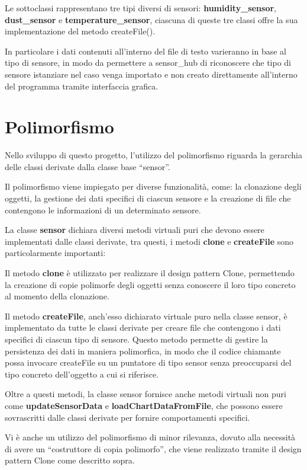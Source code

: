 \documentclass{article}
\begin{document}
    Le sottoclassi rappresentano tre tipi diversi di sensori: \textbf{humidity\_sensor}, \textbf{dust\_sensor} e \textbf{temperature\_sensor},  ciascuna di queste tre classi offre la sua implementazione del metodo createFile().

    \noindent In particolare i dati contenuti all’interno del file di testo varieranno in base al tipo di sensore, in modo da permettere a sensor\_hub di riconoscere che tipo di sensore istanziare nel caso venga importato e non creato direttamente all’interno del programma tramite interfaccia grafica. 

    \section{Polimorfismo}
    Nello sviluppo di questo progetto, l'utilizzo del polimorfismo riguarda la gerarchia delle classi derivate dalla classe base “sensor”.   


    Il polimorfismo viene impiegato per diverse funzionalità, come: la clonazione degli oggetti, la gestione dei dati specifici di ciascun sensore e la creazione di file che contengono le informazioni di un determinato sensore.

    \noindent La classe \textbf{sensor} dichiara diversi metodi virtuali puri che devono essere implementati dalle classi derivate,  tra questi, i metodi \textbf{clone} e \textbf{createFile} sono particolarmente importanti:

    \noindent Il metodo \textbf{clone} è utilizzato per realizzare il design pattern Clone, permettendo la creazione di copie polimorfe degli oggetti senza conoscere il loro tipo concreto al momento della clonazione. 

    \noindent Il metodo \textbf{createFile}, anch'esso dichiarato virtuale puro nella classe sensor, è implementato da tutte le classi derivate per creare file che contengono i dati specifici di ciascun tipo di sensore.   Questo metodo permette di gestire la persistenza dei dati in maniera polimorfica, in modo che il codice chiamante possa invocare createFile su un puntatore di tipo sensor senza preoccuparsi del tipo concreto dell'oggetto a cui si riferisce.


    \noindent Oltre a questi metodi, la classe sensor fornisce anche metodi virtuali non puri come \textbf{updateSensorData} e \textbf{loadChartDataFromFile}, che possono essere sovrascritti dalle classi derivate per fornire comportamenti specifici.


    \noindent Vi è anche un utilizzo del polimorfismo di minor rilevanza, dovuto alla necessità di avere un “costruttore di copia polimorfo”, che viene realizzato tramite il design pattern Clone come descritto sopra.  
\end{document}
